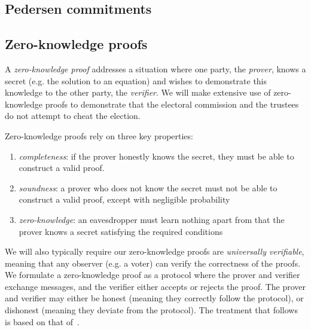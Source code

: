 \documentclass[12pt,a4paper]{article}
\theoremstyle{definition}
\newcounter{protocol}
\begin{document}
\subsection{Pedersen commitments}

\subsection{Zero-knowledge proofs}
A \textit{zero-knowledge proof} addresses a situation where one party, the \textit{prover}, knows a secret (e.g. the solution to an equation) and wishes to demonstrate this knowledge to the other party, the \textit{verifier}. We will make extensive use of zero-knowledge proofs to demonstrate that the electoral commission and the trustees do not attempt to cheat the election.

Zero-knowledge proofs rely on three key properties:
\begin{enumerate}
    \item \textit{completeness}: if the prover honestly knows the secret, they must be able to construct a valid proof.
    \item \textit{soundness}: a prover who does not know the secret must not be able to construct a valid proof, except with negligible probability
    \item \textit{zero-knowledge}: an eavesdropper must learn nothing apart from that the prover knows a secret satisfying the required conditions
\end{enumerate}
We will also typically require our zero-knowledge proofs are \textit{universally verifiable}, meaning that any observer (e.g. a voter) can verify the correctness of the proofs. We formulate a zero-knowledge proof as a protocol where the prover and verifier exchange messages, and the verifier either accepts or rejects the proof. The prover and verifier may either be honest (meaning they correctly follow the protocol), or dishonest (meaning they deviate from the protocol). The treatment that follows is based on that of~\cite{boneh2020graduate}.
\end{document}
